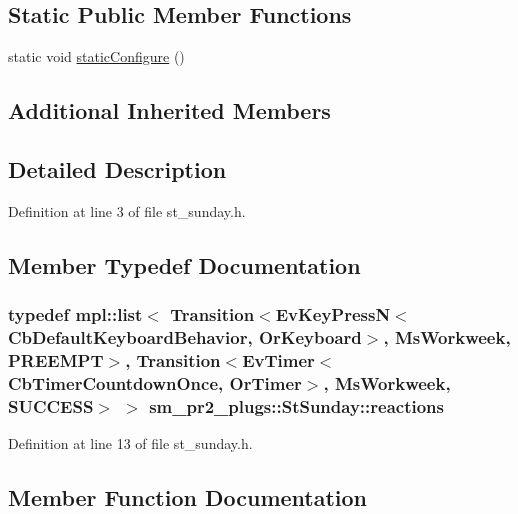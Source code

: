 \subsection*{Static Public Member Functions}
\begin{DoxyCompactItemize}
\item 
static void \hyperlink{structsm__pr2__plugs_1_1StSunday_a9875542a27afa3b7444390a3d1a59400}{static\+Configure} ()
\end{DoxyCompactItemize}
\subsection*{Additional Inherited Members}


\subsection{Detailed Description}


Definition at line 3 of file st\+\_\+sunday.\+h.



\subsection{Member Typedef Documentation}
\subsubsection[{\texorpdfstring{reactions}{reactions}}]{\setlength{\rightskip}{0pt plus 5cm}typedef mpl\+::list$<$ Transition$<$Ev\+Key\+PressN$<$Cb\+Default\+Keyboard\+Behavior, {\bf Or\+Keyboard}$>$, {\bf Ms\+Workweek}, {\bf P\+R\+E\+E\+M\+PT}$>$, Transition$<$Ev\+Timer$<$Cb\+Timer\+Countdown\+Once, {\bf Or\+Timer}$>$, {\bf Ms\+Workweek}, {\bf S\+U\+C\+C\+E\+SS}$>$ $>$ {\bf sm\+\_\+pr2\+\_\+plugs\+::\+St\+Sunday\+::reactions}}\hypertarget{structsm__pr2__plugs_1_1StSunday_acff71e969a008925b664a7eb033b457a}{}\label{structsm__pr2__plugs_1_1StSunday_acff71e969a008925b664a7eb033b457a}


Definition at line 13 of file st\+\_\+sunday.\+h.



\subsection{Member Function Documentation}
